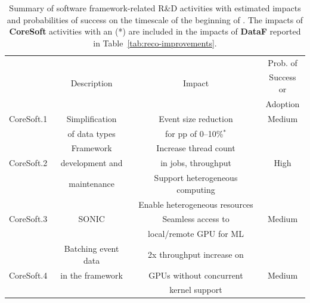 \begin{table}[tbph]
    \centering
    \caption{Summary of software framework-related R\&D activities with estimated impacts and probabilities of success on the timescale of the beginning of \RunFour. The impacts of \textbf{CoreSoft} activities with an (*) are included in the impacts of \textbf{DataF} reported in Table~\ref{tab:reco-improvements}.}      \label{tab:fwk-improvements}
    \begin{tabular}{|c|c|c|c|}
    \hline
    \rowcolor{tableheader} 
           &                          &                           & Prob. of \\ 
    \rowcolor{tableheader}
           & Description              &       Impact              & Success or \\  
    \rowcolor{tableheader}
           &                          &                           & Adoption   \\ \hline
    \cellcolor{tablerowheader}
CoreSoft.1 & Simplification         & Event size reduction      & Medium \\
    \cellcolor{tablerowheader}
           & of  data types           & for pp of 0--10\%$^*$         &        \\ \hline
    \cellcolor{tablerowheader}
           & Framework                & Increase thread count  &        \\
    \cellcolor{tablerowheader}
CoreSoft.2 & development and          & in jobs, throughput &  High  \\
    \cellcolor{tablerowheader}
           & maintenance              & Support heterogeneous computing &        \\ \hline
    \cellcolor{tablerowheader}
           &                          & Enable heterogeneous resources  &        \\
    \cellcolor{tablerowheader}
CoreSoft.3 &  SONIC                   & Seamless access to &  Medium  \\
    \cellcolor{tablerowheader}
           &                          & local/remote GPU for ML &          \\ \hline
    \cellcolor{tablerowheader}
           & Batching event data      & 2x throughput increase on &          \\
    \cellcolor{tablerowheader}
CoreSoft.4 & in the framework         & \glspl{GPU} without concurrent   & Medium   \\
    \cellcolor{tablerowheader}
           &                          & kernel support            &          \\ \hline

\end{tabular}
\end{table}
